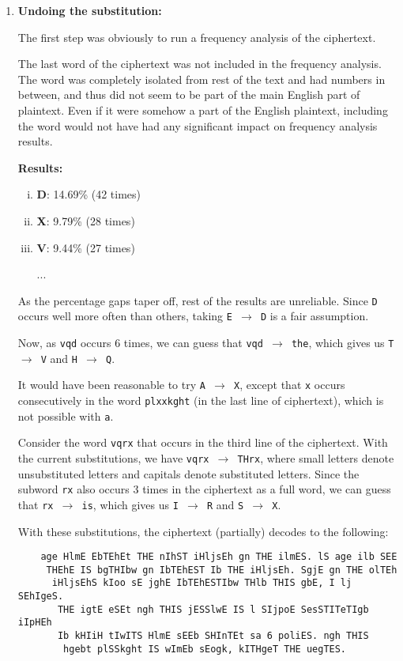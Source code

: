 \documentclass[11pt]{article}
\begin{document}
\begin{enumerate}
  \item \textbf{Undoing the substitution: }
  
  The first step was obviously to run a frequency analysis of the ciphertext. 
  
  The last word of the ciphertext was not included in the frequency analysis. The word was completely isolated from rest of the text and had numbers in between, and thus did not seem to be part of the main English part of plaintext. Even if it were somehow a part of the English plaintext, including the word would not have had any significant impact on frequency analysis results.

  \textbf{Results:}
  \begin{enumerate}[i.]
    \item \textbf{D}: 14.69\% (42 times)
    \item \textbf{X}: 9.79\% (28 times)
    \item \textbf{V}: 9.44\% (27 times)
    
    ...
  \end{enumerate}

  As the percentage gaps taper off, rest of the results are unreliable. Since \texttt{D} occurs well more often than others, taking \texttt{E $\rightarrow$ D} is a fair assumption.

  Now, as \texttt{vqd} occurs 6 times, we can guess that \texttt{vqd $\rightarrow$ the}, which gives us \texttt{T $\rightarrow$ V} and \texttt{H $\rightarrow$ Q}. 
  
  It would have been reasonable to try \texttt{A $\rightarrow$ X}, except that \texttt{x} occurs consecutively in the word \texttt{plxxkght} (in the last line of ciphertext), which is not possible with \texttt{a}.

  Consider the word \texttt{vqrx} that occurs in the third line of the ciphertext. With the current substitutions, we have \texttt{vqrx $\rightarrow$ THrx}, where small letters denote unsubstituted letters and capitals denote substituted letters. Since the subword \texttt{rx} also occurs 3 times in the ciphertext as a full word, we can guess that \texttt{rx $\rightarrow$ is}, which gives us \texttt{I $\rightarrow$ R} and \texttt{S $\rightarrow$ X}.

  With these substitutions, the ciphertext (partially) decodes to the following:

  \bigskip
  \begin{lstlisting}
    age HlmE EbTEhEt THE nIhST iHljsEh gn THE ilmES. lS age ilb SEE
     THEhE IS bgTHIbw gn IbTEhEST Ib THE iHljsEh. SgjE gn THE olTEh
      iHljsEhS kIoo sE jghE IbTEhESTIbw THlb THIS gbE, I lj SEhIgeS.
       THE igtE eSEt ngh THIS jESSlwE IS l SIjpoE SesSTITeTIgb iIpHEh 
       Ib kHIiH tIwITS HlmE sEEb SHInTEt sa 6 poliES. ngh THIS
        hgebt plSSkght IS wImEb sEogk, kITHgeT THE uegTES.
  \end{lstlisting}
  \bigskip


\end{enumerate}
\end{document}
